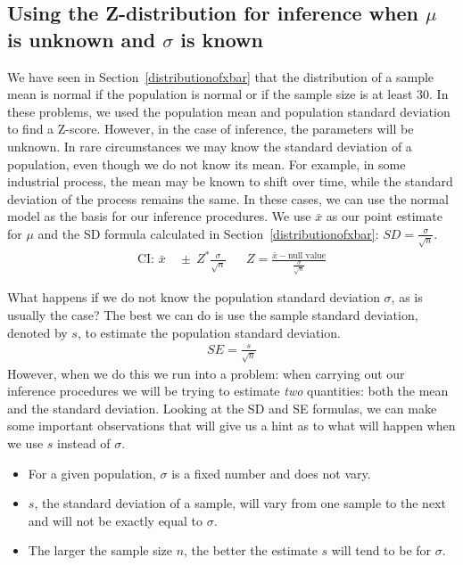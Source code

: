 \subsection{Using the Z-distribution for inference when $\mu$ is unknown and $\sigma$ is known}
\label{nearlyNormalPopWithKnownSD}

We have seen in Section~\ref{distributionofxbar} that the distribution of a sample mean is normal if the population is normal or if the sample size is at least 30. In these problems, we used the population mean and population standard deviation to find a Z-score. However, in the case of inference, the parameters will be unknown. In rare circumstances we may know the standard deviation of a population, even though we do not know its mean. For example, in some industrial process, the mean may be known to shift over time, while the standard deviation of the process remains the same. In these cases, we can use the normal model as the basis for our inference procedures. We use $\bar{x}$ as our point estimate for $\mu$ and the SD formula calculated in Section~\ref{distributionofxbar}: $SD =\frac{\sigma}{\sqrt{n}}$.
\begin{align*}
\text{CI:  } \bar{x} &\ \pm \ Z^*\frac{\sigma}{\sqrt{n}}
&&Z = \frac{\bar{x} - \text{null value}}{\frac{\sigma}{\sqrt{n}}}
\end{align*}

What happens if we do not know the population standard deviation $\sigma$, as is usually the case?  The best we can do is use the sample standard deviation, denoted by $s$, to estimate the population standard deviation.
\begin{align*}
SE= \frac{s}{\sqrt{n}}
\end{align*}
However, when we do this we run into a problem:  when carrying out our inference procedures we will be trying to estimate \emph{two} quantities: both the mean and the standard deviation. Looking at the SD and SE formulas, we can make some important observations that will give us a hint as to what will happen when we use $s$ instead of $\sigma$.
\begin{itemize}
\setlength{\itemsep}{0mm}
\item For a given population, $\sigma$ is a fixed number and does not vary.
\item $s$, the standard deviation of a sample, will vary from one sample to the next and will not be exactly equal to $\sigma$.
\item The larger the sample size $n$, the better the estimate $s$ will tend to be for $\sigma$.
\end{itemize}

